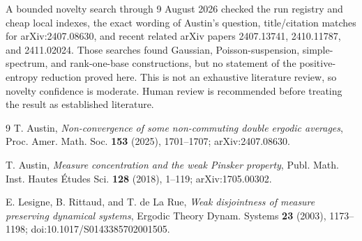 \documentclass[11pt]{article}
\begin{document}
A bounded novelty search through 9 August 2026 checked the run registry and
cheap local indexes, the exact wording of Austin's question, title/citation
matches for arXiv:2407.08630, and recent related arXiv papers 2407.13741,
2410.11787, and 2411.02024.  Those searches found Gaussian,
Poisson-suspension, simple-spectrum, and rank-one-base constructions, but no
statement of the positive-entropy reduction proved here.  This is not an
exhaustive literature review, so novelty confidence is moderate.  Human
review is recommended before treating the result as established literature.

\begin{thebibliography}{9}
T. Austin,
\emph{Non-convergence of some non-commuting double ergodic averages},
Proc. Amer. Math. Soc. \textbf{153} (2025), 1701--1707;
arXiv:2407.08630.

T. Austin,
\emph{Measure concentration and the weak Pinsker property},
Publ. Math. Inst. Hautes \'{E}tudes Sci. \textbf{128} (2018), 1--119;
arXiv:1705.00302.

E. Lesigne, B. Rittaud, and T. de La Rue,
\emph{Weak disjointness of measure preserving dynamical systems},
Ergodic Theory Dynam. Systems \textbf{23} (2003), 1173--1198;
doi:10.1017/S0143385702001505.
\end{thebibliography}
\end{document}
